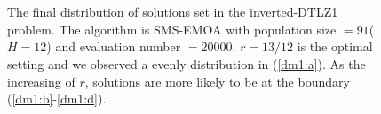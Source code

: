 \documentclass[conference]{IEEEtran}
\begin{document}
\begin{figure}[!t]
  \centering
  \quad
  \\
  \quad
  \\
  \caption{The final distribution of solutions set in the inverted-DTLZ1 problem.
  The algorithm is SMS-EMOA with population size $=91$($H=12$) and evaluation number $=20000$.
  $r=13/12$ is the optimal setting and we observed a evenly distribution in (\ref{dm1:a}).
  As the increasing of $r$, solutions are more likely to be at the boundary
  (\ref{dm1:b}-\ref{dm1:d}). 
  }
  \label{dm1}
\end{figure}

%
% 
\end{document}
